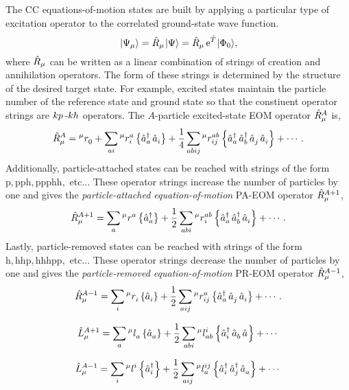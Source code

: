 \documentclass[thesis.tex]{subfiles}
\begin{document}
The CC equations-of-motion states are built by applying a particular type of excitation operator to the correlated ground-state wave function.
\begin{equation}\label{eq:ladder_def}
  \hspace{1pt}\lvert \Psi_{\mu} \rangle = \hat{R}\hspace{-0.1pt}_{\mu}\hspace{1pt}\lvert \Psi \rangle = \hat{R}\hspace{-0.1pt}_{\mu}\operatorname{e}^{\hat{T}\hspace{-0.25pt}}\hspace{1pt}\lvert \Phi_{0} \rangle,
\end{equation}
where $\hat{R}\hspace{-0.1pt}_{\mu}$ can be written as a linear combination of strings of creation and annihilation operators.  The form of these strings is determined by the structure of the desired target state.  For example, excited states maintain the particle number of the reference state and ground state so that the constiuent operator strings are $kp\hspace{2pt}\text{-}kh$ operators.  The $A$-particle excited-state EOM operator $\hat{R}\hspace{-0.1pt}^{A}_{\mu}$ is,
\begin{equation}
  \hat{R}\hspace{-0.1pt}^{A}_{\mu} = {}^{\mu}r^{}_{0} + \sum_{ai}{}^{\mu}r^{a}_{i}\left\{\mathop{\hat{a}^{\dagger}_{a}}\mathop{\hat{a}^{}_{i}}\right\} + \frac{1}{4}\sum_{abij}{}^{\mu}r^{ab}_{ij}\left\{\mathop{\hat{a}^{\dagger}_{a}}\mathop{\hat{a}^{\dagger}_{b}}\mathop{\hat{a}^{}_{j}}\mathop{\hat{a}^{}_{i}}\right\} + \cdots.
\end{equation}
Additionally, particle-attached states can be reached with strings of the form $\mathrm{p,pph,ppphh,}$ etc...  These operator strings increase the number of particles by one and gives the \textit{particle-attached equation-of-motion} PA-EOM operator $\hat{R}\hspace{-0.1pt}^{A+1}_{\mu}$,
\begin{equation}
  \hat{R}\hspace{-0.1pt}^{A+1}_{\mu} = \sum_{a}{}^{\mu}r^{a}_{}\left\{\mathop{\hat{a}^{\dagger}_{a}}\right\} + \frac{1}{2}\sum_{abi}{}^{\mu}r^{ab}_{i}\left\{\mathop{\hat{a}^{\dagger}_{a}}\mathop{\hat{a}^{\dagger}_{b}}\mathop{\hat{a}^{}_{i}}\right\} + \cdots.
\end{equation}
Lastly, particle-removed states can be reached with strings of the form $\mathrm{h,hhp,hhhpp,}$ etc...  These operator strings decrease the number of particles by one and gives the \textit{particle-removed equation-of-motion} PR-EOM operator $\hat{R}\hspace{-0.1pt}^{A-1}_{\mu}$,
\begin{equation}
  \hat{R}\hspace{-0.1pt}^{A-1}_{\mu} = \sum_{i}{}^{\mu}r^{}_{i}\left\{\mathop{\hat{a}^{}_{i}}\right\} + \frac{1}{2}\sum_{aij}{}^{\mu}r^{a}_{ij}\left\{\mathop{\hat{a}^{\dagger}_{a}}\mathop{\hat{a}^{}_{j}}\mathop{\hat{a}^{}_{i}}\right\} + \cdots.
\end{equation}

\begin{equation}
  \hat{L}\hspace{-0.1pt}^{A+1}_{\mu} = \sum_{a}{}^{\mu}l^{}_{a}\left\{\mathop{\hat{a}^{}_{a}}\right\} + \frac{1}{2}\sum_{abi}{}^{\mu}l^{i}_{ab}\left\{\mathop{\hat{a}^{\dagger}_{i}}\mathop{\hat{a}^{}_{b}}\mathop{\hat{a}^{}_{}}\right\} + \cdots
\end{equation}

\begin{equation}
  \hat{L}\hspace{-0.1pt}^{A-1}_{\mu} = \sum_{i}{}^{\mu}l^{i}_{}\left\{\mathop{\hat{a}^{\dagger}_{i}}\right\} + \frac{1}{2}\sum_{aij}{}^{\mu}l^{ij}_{a}\left\{\mathop{\hat{a}^{\dagger}_{i}}\mathop{\hat{a}^{\dagger}_{j}}\mathop{\hat{a}^{}_{a}}\right\} + \cdots
\end{equation}
\end{document}
